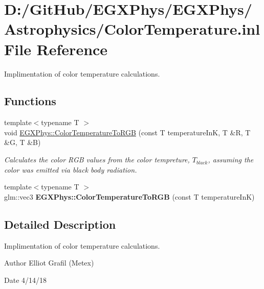 \hypertarget{_color_temperature_8inl}{}\section{D\+:/\+Git\+Hub/\+E\+G\+X\+Phys/\+E\+G\+X\+Phys/\+Astrophysics/\+Color\+Temperature.inl File Reference}
\label{_color_temperature_8inl}


Implimentation of color temperature calculations.  


\subsection*{Functions}
\begin{DoxyCompactItemize}
\item 
{\footnotesize template$<$typename T $>$ }\\void \mbox{\hyperlink{group___e_g_x_phys-_astrophysics-_color_temperature_ga81db6b5b397c9f788001be73adae032d}{E\+G\+X\+Phys\+::\+Color\+Temperature\+To\+R\+GB}} (const T temperature\+InK, T \&R, T \&G, T \&B)
\begin{DoxyCompactList}\small\item\em Calculates the color R\+GB values from the color tempreture, $T_{black}$, assuming the color was emitted via black body radiation. \end{DoxyCompactList}\item 
\mbox{\label{_color_temperature_8inl_aad787485a232976da96c2c785ce21dad}} 
{\footnotesize template$<$typename T $>$ }\\glm\+::vec3 {\bfseries E\+G\+X\+Phys\+::\+Color\+Temperature\+To\+R\+GB} (const T temperature\+InK)
\end{DoxyCompactItemize}


\subsection{Detailed Description}
Implimentation of color temperature calculations. 

\begin{DoxyAuthor}{Author}
Elliot Grafil (Metex) 
\end{DoxyAuthor}
\begin{DoxyDate}{Date}
4/14/18 
\end{DoxyDate}
